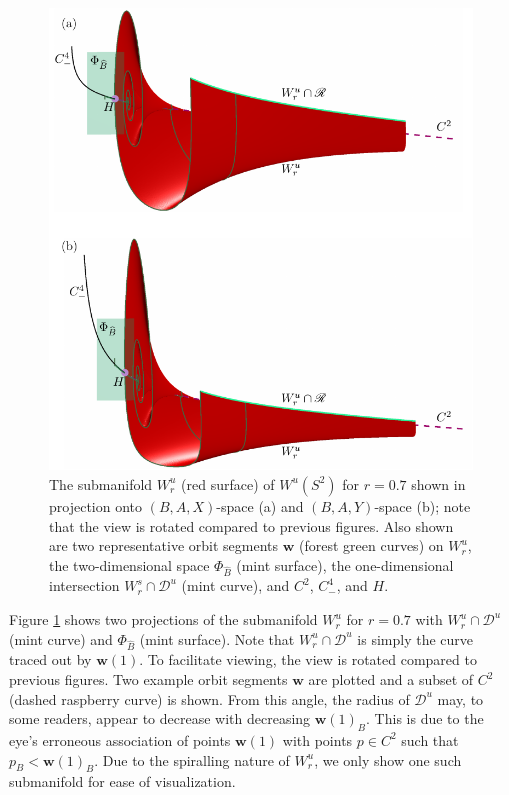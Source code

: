 \documentclass{ws-ijbc}
\begin{document}
\begin{figure}[H]
\centering
\includegraphics[]{./figures/MKMO_8.pdf}
\caption{The submanifold $W^u_{r}$ (red surface) of $W^u(S^2)$ for $r=0.7$ shown in projection onto $(B,A,X)$-space (a) and $(B,A,Y)$-space (b); note that the view is rotated compared to previous figures.  Also shown are two representative orbit segments $\mathbf{w}$ (forest green curves) on $W^u_{r}$, the two-dimensional space $\Phi_{\widehat{B}}$ (mint surface), the one-dimensional intersection $W^s_{r}\cap\mathscr{D}^u$ (mint curve), and $C^2$, $C^4_-$, and $H$.}
\label{figure_8}
\end{figure}

Figure \ref{figure_8} shows two projections of the submanifold $W^u_{r}$ for $r=0.7$ with $W^u_{r} \cap \mathscr{D}^u$ (mint curve) and $\Phi_{\widehat{B}}$ (mint surface).  Note that $W^u_{r}\cap\mathscr{D}^u$ is simply the curve traced out by $\mathbf{w}(1)$.  To facilitate viewing, the view is rotated compared to previous figures.  Two example orbit segments $\mathbf{w}$ are plotted and a subset of $C^2$ (dashed raspberry curve) is shown.  From this angle, the radius of $\mathscr{D}^u$ may, to some readers, appear to decrease with decreasing $\mathbf{w}(1)_B$.  This is due to the eye's erroneous association of points $\mathbf{w}(1)$ with points $p \in C^2$ such that $p_B < \mathbf{w}(1)_B$.  Due to the spiralling nature of $W^u_r$, we only show one such submanifold for ease of visualization.
\end{document}
